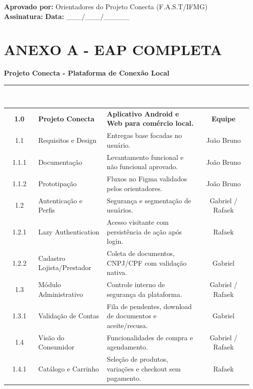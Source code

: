 \documentclass[11pt, a4paper]{article}
\begin{document}
\vspace{1cm}
\noindent
\textbf{Aprovado por:} Orientadores do Projeto Conecta (F.A.S.T/IFMG) \\
\textbf{Assinatura:} \hrulefill \quad \textbf{Data:} \_\_\_/\_\_\_/\_\_\_\_\_

\newpage

\section*{\textcolor{headerblue}{ANEXO A - EAP COMPLETA}}
\textbf{Projeto Conecta - Plataforma de Conexão Local}

\begin{center}
\renewcommand{\arraystretch}{1.3}
\begin{tabularx}{\textwidth}{|c|X|X|c|}
\hline
\rowcolor{headerblue}
\textcolor{white}{\textbf{Código}} & \textcolor{white}{\textbf{Elemento da EAP}} & \textcolor{white}{\textbf{Entrega / resultado verificável}} & \textcolor{white}{\textbf{Responsável}} \\
\hline
\textbf{1.0} & \textbf{Projeto Conecta} & \textbf{Aplicativo Android e Web para comércio local.} & \textbf{Equipe} \\
\hline
\rowcolor{rowgray}
1.1 & Requisitos e Design & Entregas base focadas no usuário. & João Bruno \\
\hline
1.1.1 & Documentação & Levantamento funcional e não funcional aprovado. & João Bruno \\
\hline
1.1.2 & Prototipação & Fluxos no Figma validados pelos orientadores. & João Bruno \\
\hline
\rowcolor{rowgray}
1.2 & Autenticação e Perfis & Segurança e segmentação de usuários. & Gabriel / Rafaek \\
\hline
1.2.1 & Lazy Authentication & Acesso visitante com persistência de ação após login. & Rafaek \\
\hline
1.2.2 & Cadastro Lojista/Prestador & Coleta de documentos, CNPJ/CPF com validação nativa. & Gabriel \\
\hline
\rowcolor{rowgray}
1.3 & Módulo Administrativo & Controle interno de segurança da plataforma. & Gabriel / Rafaek \\
\hline
1.3.1 & Validação de Contas & Fila de pendentes, download de documentos e aceite/recusa. & Gabriel \\
\hline
\rowcolor{rowgray}
1.4 & Visão do Consumidor & Funcionalidades de compra e agendamento. & Gabriel / Rafaek \\
\hline
1.4.1 & Catálogo e Carrinho & Seleção de produtos, variações e checkout sem pagamento. & Rafaek \\

\end{tabularx}
\end{center}
\end{document}
